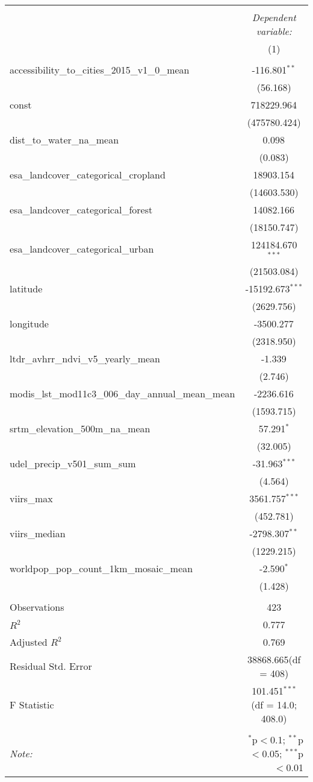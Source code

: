 \begin{table}[!htbp] \centering
\begin{tabular}{@{\extracolsep{5pt}}lc}
\\[-1.8ex]\hline
\hline \\[-1.8ex]
& \multicolumn{1}{c}{\textit{Dependent variable:}} \
\cr \cline{1-2}
\\[-1.8ex] & (1) \\
\hline \\[-1.8ex]
 accessibility_to_cities_2015_v1_0_mean & -116.801$^{**}$ \\
  & (56.168) \\
 const & 718229.964$^{}$ \\
  & (475780.424) \\
 dist_to_water_na_mean & 0.098$^{}$ \\
  & (0.083) \\
 esa_landcover_categorical_cropland & 18903.154$^{}$ \\
  & (14603.530) \\
 esa_landcover_categorical_forest & 14082.166$^{}$ \\
  & (18150.747) \\
 esa_landcover_categorical_urban & 124184.670$^{***}$ \\
  & (21503.084) \\
 latitude & -15192.673$^{***}$ \\
  & (2629.756) \\
 longitude & -3500.277$^{}$ \\
  & (2318.950) \\
 ltdr_avhrr_ndvi_v5_yearly_mean & -1.339$^{}$ \\
  & (2.746) \\
 modis_lst_mod11c3_006_day_annual_mean_mean & -2236.616$^{}$ \\
  & (1593.715) \\
 srtm_elevation_500m_na_mean & 57.291$^{*}$ \\
  & (32.005) \\
 udel_precip_v501_sum_sum & -31.963$^{***}$ \\
  & (4.564) \\
 viirs_max & 3561.757$^{***}$ \\
  & (452.781) \\
 viirs_median & -2798.307$^{**}$ \\
  & (1229.215) \\
 worldpop_pop_count_1km_mosaic_mean & -2.590$^{*}$ \\
  & (1.428) \\
\hline \\[-1.8ex]
 Observations & 423 \\
 $R^2$ & 0.777 \\
 Adjusted $R^2$ & 0.769 \\
 Residual Std. Error & 38868.665(df = 408)  \\
 F Statistic & 101.451$^{***}$ (df = 14.0; 408.0) \\
\hline
\hline \\[-1.8ex]
\textit{Note:} & \multicolumn{1}{r}{$^{*}$p$<$0.1; $^{**}$p$<$0.05; $^{***}$p$<$0.01} \\
\end{tabular}
\end{table}